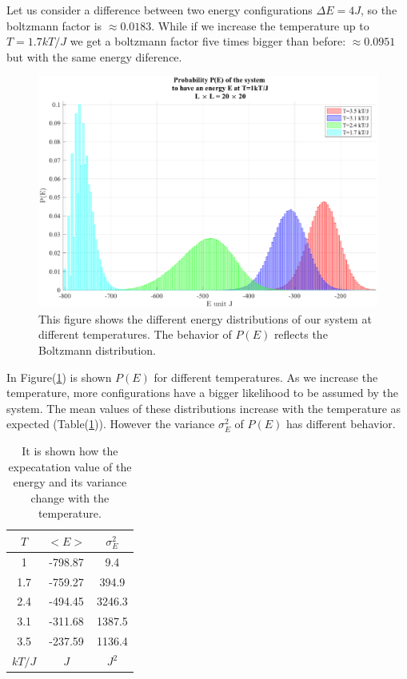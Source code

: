 \documentclass[%
preprint,
 amsmath,amssymb,
 aps,
]{revtex4-1}
\theoremstyle{plain}
\theoremstyle{definition}
\theoremstyle{plain}
\begin{document}
Let us consider a difference between two energy configurations $\Delta E=4J$, so the boltzmann factor is $\approx 0.0183$. While if we increase the temperature up to $T= 1.7 kT/J$ we get a boltzmann factor five times bigger than before: $\approx 0.0951$ but with the same energy diference.
\begin{center}
\begin{figure}[h]
\includegraphics[scale=0.55]{pet20x20.eps}
\caption{This figure shows the different  energy distributions of our system at different temperatures. The behavior of $P(E)$ reflects the Boltzmann distribution.}
\label{pet20x20}
\end{figure}
\end{center}
In Figure(\ref{pet20x20}) is shown $P(E)$ for different temperatures. As we increase the temperature, more configurations have a bigger likelihood to be assumed by the system. The mean values of these distributions increase with the temperature as expected (Table(\ref{configurations})). However the variance $\sigma^2 _E$ of $P(E)$ has different behavior.
\begin{table}
\centering
\setlength{\tabcolsep}{12pt}
\caption{It is shown how the expecatation value of the energy and its variance change with the temperature.}
\label{configurations}
\begin{tabular}{ccc}
\toprule
$T$ &  $<E>$ & $\sigma^2 _E$ \\
\midrule
1	&	-798.87	&	9.4 \\
1.7	&	-759.27 &	394.9\\
2.4	&	-494.45 &	3246.3\\
3.1	&	-311.68 &	1387.5 \\
3.5	&	-237.59 &	1136.4 \\
\bottomrule
$kT/J$ & $J$ & $J^2$
\end{tabular}

\end{table}
\end{document}
